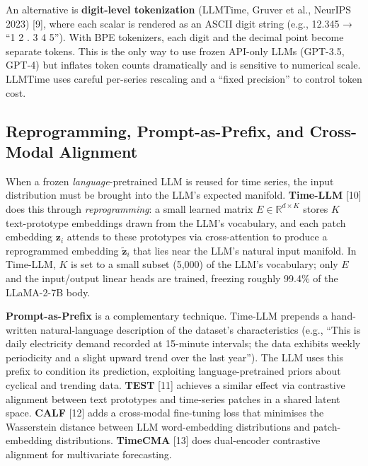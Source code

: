\documentclass{article}
\begin{document}
An alternative is \textbf{digit-level tokenization} (LLMTime, Gruver et al., NeurIPS 2023) {[}9{]}, where each scalar is rendered as an ASCII digit string (e.g., 12.345 → ``1 2 . 3 4 5''). With BPE tokenizers, each digit and the decimal point become separate tokens. This is the only way to use frozen API-only LLMs (GPT-3.5, GPT-4) but inflates token counts dramatically and is sensitive to numerical scale. LLMTime uses careful per-series rescaling and a ``fixed precision'' to control token cost.

\subsection{Reprogramming, Prompt-as-Prefix, and Cross-Modal Alignment}\label{reprogramming-prompt-as-prefix-and-cross-modal-alignment}

When a frozen \emph{language}-pretrained LLM is reused for time series, the input distribution must be brought into the LLM's expected manifold. \textbf{Time-LLM} {[}10{]} does this through \emph{reprogramming}: a small learned matrix \(E \in \mathbb{R}^{d \times K}\) stores \(K\) text-prototype embeddings drawn from the LLM's vocabulary, and each patch embedding \(\mathbf{z}_i\) attends to these prototypes via cross-attention to produce a reprogrammed embedding \(\tilde{\mathbf{z}}_i\) that lies near the LLM's natural input manifold. In Time-LLM, \(K\) is set to a small subset (5,000) of the LLM's vocabulary; only \(E\) and the input/output linear heads are trained, freezing roughly 99.4\% of the LLaMA-2-7B body.

\textbf{Prompt-as-Prefix} is a complementary technique. Time-LLM prepends a hand-written natural-language description of the dataset's characteristics (e.g., ``This is daily electricity demand recorded at 15-minute intervals; the data exhibits weekly periodicity and a slight upward trend over the last year''). The LLM uses this prefix to condition its prediction, exploiting language-pretrained priors about cyclical and trending data. \textbf{TEST} \citep{sun2024testtextprototypea} {[}11{]} achieves a similar effect via contrastive alignment between text prototypes and time-series patches in a shared latent space. \textbf{CALF} \citep{liu2025calfaligningllmsfo} {[}12{]} adds a cross-modal fine-tuning loss that minimises the Wasserstein distance between LLM word-embedding distributions and patch-embedding distributions. \textbf{TimeCMA} \citep{liu2025calfaligningllmsfo} {[}13{]} does dual-encoder contrastive alignment for multivariate forecasting.
\end{document}
